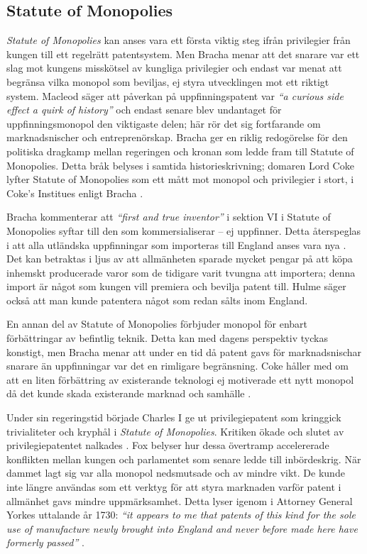 
\subsection{Statute of Monopolies} 
\label{sub:statue_of_monopolies}

\emph{Statute of Monopolies} kan anses vara ett första viktig steg ifrån privilegier från kungen till ett
regelrätt patentsystem. Men Bracha \cite{bracha} menar att det snarare var ett slag mot kungens misskötsel av kungliga privilegier
och endast var menat att begränsa vilka monopol som beviljas, ej styra utvecklingen mot ett riktigt
system. Macleod \cite{macleod2} säger att påverkan på uppfinningspatent  var \emph{``a curious side effect a quirk of history''} och endast
senare blev undantaget för uppfinningsmonopol den viktigaste delen; här rör det sig fortfarande om marknadsnischer och entreprenörskap. Bracha ger en riklig redogörelse för den politiska dragkamp mellan regeringen och kronan som ledde fram till Statute of Monopolies. Detta bråk belyses i samtida historieskrivning; domaren Lord Coke lyfter Statute of Monopolies som ett mått mot monopol och privilegier i stort, i Coke's Institues \cite{coke} enligt Bracha \cite{bracha}.

Bracha kommenterar att \emph{``first and true inventor''} i sektion VI i Statute of Monopolies syftar till den som kommersialiserar -- ej uppfinner. Detta återspeglas i att alla utländska uppfinningar som importeras till England anses vara nya \cite{bracha}. Det kan betraktas i ljus av att allmänheten sparade mycket pengar på att köpa inhemskt producerade varor som de tidigare varit tvungna att importera; denna import är något som kungen vill premiera och bevilja patent till. Hulme \cite{hulme2} säger också att man kunde patentera något som redan sålts inom England.  

En annan del av Statute of Monopolies förbjuder monopol för enbart förbättringar av befintlig teknik. Detta kan med dagens perspektiv tyckas konstigt, men Bracha \cite{bracha} menar att under en tid då patent gavs för marknadsnischar snarare än uppfinningar var det en rimligare begränsning.
Coke håller med om att en liten förbättring av existerande teknologi ej motiverade ett nytt monopol då det kunde skada existerande marknad och samhälle \cite{bracha}.

Under sin regeringstid började Charles I ge ut privilegiepatent som kringgick trivialiteter och kryphål i \emph{Statute of
Monopolies}. Kritiken ökade och slutet av privilegiepatentet nalkades \cite{bracha}. Fox \cite{Fox} belyser hur dessa övertramp accelererade
konflikten mellan kungen och parlamentet som senare ledde till inbördeskrig. När dammet lagt sig
var alla monopol nedsmutsade och av mindre vikt. De kunde inte längre användas som ett verktyg för att styra
marknaden varför patent i allmänhet gavs mindre uppmärksamhet. Detta lyser igenom i Attorney General Yorkes uttalande år 1730: \emph{``it appears to me that patents of this kind for the sole use of manufacture newly brought into England and never before made here have formerly passed''} \cite{macleod2}. 

